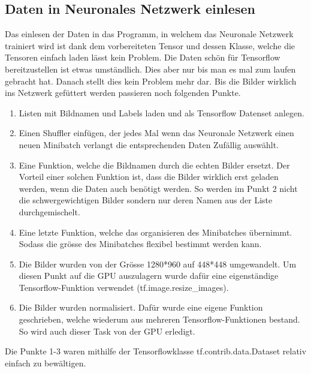 \subsection{Daten in Neuronales Netzwerk einlesen}
Das einlesen der Daten in das Programm, in welchem das Neuronale Netzwerk trainiert wird ist dank dem vorbereiteten Tensor und dessen Klasse, welche die Tensoren einfach laden lässt kein Problem. 
Die Daten schön für Tensorflow bereitzustellen ist etwas umständlich.
Dies aber nur bis man es mal zum laufen gebracht hat. 
Danach stellt dies kein Problem mehr dar. 
Bis die Bilder wirklich ins Netzwerk gefüttert werden passieren noch folgenden Punkte. 
\begin{enumerate}
\item Listen mit Bildnamen und Labels laden und als Tensorflow Datenset anlegen.
\item Einen \grqq{}Shuffler\grqq{} einfügen, der jedes Mal wenn das Neuronale Netzwerk einen neuen Minibatch verlangt die entsprechenden Daten Zufällig auswählt.
\item Eine Funktion, welche die Bildnamen durch die echten Bilder ersetzt. 
Der Vorteil einer solchen Funktion ist, dass die Bilder wirklich erst geladen werden, wenn die Daten auch benötigt werden. 
So werden im Punkt 2 nicht die schwergewichtigen Bilder sondern nur deren Namen aus der Liste durchgemischelt. 
\item Eine letzte Funktion, welche das organisieren des Minibatches übernimmt. Sodass die grösse des Minibatches flexibel bestimmt werden kann.
\item Die Bilder wurden von der Grösse 1280*960 auf 448*448 umgewandelt. 
Um diesen Punkt auf die GPU auszulagern wurde dafür eine eigenständige Tensorflow-Funktion verwendet (tf.image.resize\_images). 
\item Die Bilder wurden normalisiert. 
Dafür wurde eine eigene Funktion geschrieben, welche wiederum aus mehreren Tensorflow-Funktionen bestand. 
So wird auch dieser Task von der GPU erledigt.
\end{enumerate}
Die Punkte 1-3 waren mithilfe der Tensorflowklasse \grqq{}tf.contrib.data.Dataset\grqq{} relativ einfach zu bewältigen.
